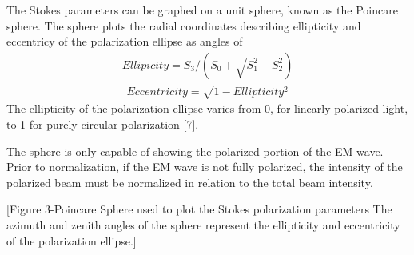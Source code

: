 %
The Stokes parameters can be graphed on a unit sphere, known as the Poincare sphere.  The sphere plots the radial coordinates describing ellipticity and eccentricy of the polarization ellipse as angles of
%
\begin{align}
    Ellipicity = S_3/(S_0+\sqrt{S_1^2+S_2^2 })
\end{align}
\begin{align}
    Eccentricity= \sqrt{1-Ellipticity^2}
\end{align}
%
The ellipticity of the polarization ellipse varies from 0, for linearly polarized light, to 1 for purely circular polarization [7].

The sphere is only capable of showing the polarized portion of the EM wave.  Prior to normalization, if the EM wave is not fully polarized, the intensity of the polarized beam must be normalized in relation to the total beam intensity.

[Figure 3-Poincare Sphere used to plot the Stokes polarization parameters
The azimuth and zenith angles of the sphere represent the ellipticity and eccentricity of the polarization ellipse.]
